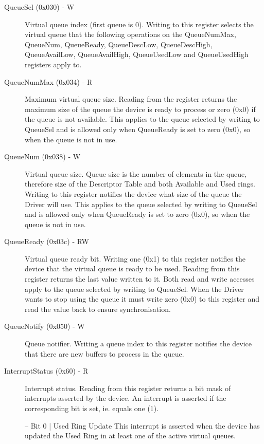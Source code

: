 \begin{description}
\item[QueueSel (0x030) - W]
  Virtual queue index (first queue is 0).
  Writing to this register selects the virtual queue that the
  following operations on the QueueNumMax, QueueNum, QueueReady,
  QueueDescLow, QueueDescHigh, QueueAvailLow, QueueAvailHigh,
  QueueUsedLow and QueueUsedHigh registers apply to.

\item[QueueNumMax (0x034) - R]
  Maximum virtual queue size.
  Reading from the register returns the maximum size of the queue
  the device is ready to process or zero (0x0) if the queue is not
  available. This applies to the queue selected by writing to
  QueueSel and is allowed only when QueueReady is set to zero
  (0x0), so when the queue is not in use.

\item[QueueNum (0x038) - W]
  Virtual queue size.
  Queue size is the number of elements in the queue, therefore size
  of the Descriptor Table and both Available and Used rings.
  Writing to this register notifies the device what size of the
  queue the Driver will use. This applies to the queue selected by
  writing to QueueSel and is allowed only when QueueReady is set
  to zero (0x0), so when the queue is not in use.

\item[QueueReady (0x03c) - RW]
  Virtual queue ready bit.
  Writing one (0x1) to this register notifies the device that the
  virtual queue is ready to be used. Reading from this register
  returns the last value written to it. Both read and write
  accesses apply to the queue selected by writing to QueueSel.
  When the Driver wants to stop using the queue it must write
  zero (0x0) to this register and read the value back to
  ensure synchronisation.

\item[QueueNotify (0x050) - W]
  Queue notifier.
  Writing a queue index to this register notifies the device that
  there are new buffers to process in the queue.

\item[InterruptStatus (0x60) - R]
  Interrupt status.
  Reading from this register returns a bit mask of interrupts
  asserted by the device. An interrupt is asserted if the
  corresponding bit is set, ie. equals one (1).

  – Bit 0 | Used Ring Update
    This interrupt is asserted when the device has updated the Used
    Ring in at least one of the active virtual queues.


\end{description}
